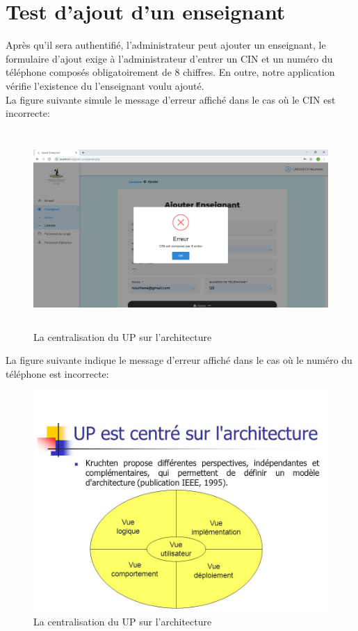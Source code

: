 \documentclass[12 pt ]{report}
\begin{document}
\section{Test d'ajout d'un enseignant}
Après qu'il sera authentifié, l'administrateur peut ajouter un enseignant, le formulaire d'ajout exige à l'administrateur d'entrer un CIN et un numéro du téléphone composés obligatoirement de 8 chiffres. En outre, notre application vérifie l'existence du l'enseignant voulu ajouté. \\
La figure suivante simule le message d'erreur affiché dans le cas où le CIN est incorrecte:
\begin{figure}[h]
\begin{center}
\includegraphics[width=14cm,height=7.5cm]{ajoute1.png}
\caption{ La centralisation du UP sur l'architecture}
\end{center}
\end{figure}
La figure suivante indique le message d'erreur affiché dans le cas où le numéro du téléphone est incorrecte:
\begin{figure}[h]
\begin{center}
\includegraphics[scale=0.5]{u.jpg}
\caption{ La centralisation du UP sur l'architecture}
\end{center}
\end{figure}
\end{document}
